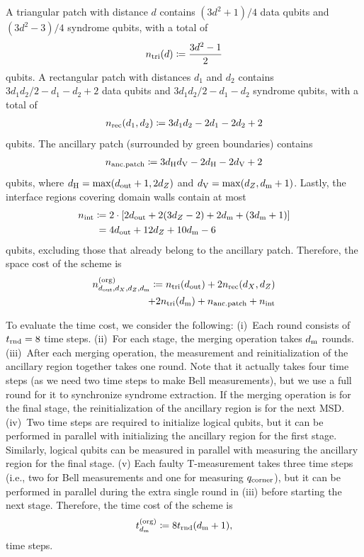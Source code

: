 \documentclass[
 prx,
 reprint,
 superscriptaddress,
 longbibliography,
 dvipsnames
]{revtex4-2}
\begin{document}
A triangular patch with distance $d$ contains $(3d^2 + 1)/4$ data qubits and $(3d^2 -3)/4$ syndrome qubits, with a total of
\begin{align*}
    n_{\mathrm{tri}}\qty(d) \coloneqq \frac{3d^2 - 1}{2}
\end{align*}
qubits.
A rectangular patch with distances $d_1$ and $d_2$ contains $3d_1 d_2 / 2 - d_1 - d_2 + 2$ data qubits and $3d_1 d_2 / 2 - d_1 - d_2$ syndrome qubits, with a total of
\begin{align*}
    n_{\mathrm{rec}}\qty(d_1,d_2) \coloneqq 3 d_1 d_2 - 2d_1 - 2d_2 + 2
\end{align*}
qubits.
The ancillary patch (surrounded by green boundaries) contains
\begin{align*}
    n_{\mathrm{anc.patch}} \coloneqq 3d_{\mathrm{H}} d_{\mathrm{V}} - 2d_{\mathrm{H}} - 2d_{\mathrm{V}} + 2
\end{align*}
qubits, where $d_{\mathrm{H}} = \max(d_{\mathrm{out}} + 1, 2{d_Z})$ and $d_{\mathrm{V}} = \max({d_Z}, d_{\mathrm{m}} + 1)$.
Lastly, the interface regions covering domain walls contain at most
\begin{align*}
    n_{\mathrm{int}} \coloneqq{}& 2 \cdot \qty[2d_{\mathrm{out}} + 2\qty(3{d_Z} - 2) + 2d_{\mathrm{m}} + (3d_{\mathrm{m}} + 1) ] \\ 
    ={}& 4d_{\mathrm{out}} + 12{d_Z} + 10d_{\mathrm{m}} - 6
\end{align*}
qubits, excluding those that already belong to the ancillary patch.
Therefore, the space cost of the scheme is
\begin{align}
\begin{split}
    n^{(\mathrm{org})}_{d_{\mathrm{out}},{d_X},{d_Z},d_{\mathrm{m}}} \coloneqq n_{\mathrm{tri}}\qty(d_{\mathrm{out}}) + 2n_{\mathrm{rec}}\qty({d_X},{d_Z}) \\
    + 2n_{\mathrm{tri}}\qty(d_{\mathrm{m}}) + n_{\mathrm{anc.patch}} + n_{\mathrm{int}}
\end{split}
    \label{eq:org_space_cost}
\end{align}

To evaluate the time cost, we consider the following:
(i)~Each round consists of $t_{\mathrm{rnd}} = 8$ time steps.
(ii)~For each stage, the merging operation takes $d_{\mathrm{m}}$ rounds.
(iii)~After each merging operation, the measurement and reinitialization of the ancillary region together takes one round. Note that it actually takes four time steps (as we need two time steps to make Bell measurements), but we use a full round for it to synchronize syndrome extraction. If the merging operation is for the final stage, the reinitialization of the ancillary region is for the next MSD.
(iv)~Two time steps are required to initialize logical qubits, but it can be performed in parallel with initializing the ancillary region for the first stage. Similarly, logical qubits can be measured in parallel with measuring the ancillary region for the final stage.
(v) Each faulty T-measurement takes three time steps (i.e., two for Bell measurements and one for measuring $q_{\mathrm{corner}}$), but it can be performed in parallel during the extra single round in (iii) before starting the next stage.
Therefore, the time cost of the scheme is
\begin{align}
    t^{(\mathrm{org})}_{d_{\mathrm{m}}} \coloneqq 8t_{\mathrm{rnd}}(d_{\mathrm{m}} + 1),
    \label{eq:org_time_cost}
\end{align}
time steps.
\end{document}
